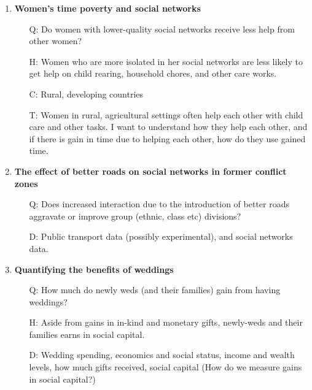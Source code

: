 \documentclass[12pt]{article}
\begin{document}
\begin{enumerate}
	\item \textbf{Women's time poverty and social networks}
		\begin{itemize}
			\item[Q:] Do women with lower-quality social networks receive less help from other women?
			\item[H:] Women who are more isolated in her social networks are less likely to get help on child rearing, household chores, and other care works.
			\item[C:] Rural, developing countries
			\item[T:] Women in rural, agricultural settings often help each other with child care and other tasks. I want to understand how they help each other, and if there is gain in time due to helping each other, how do they use gained time.
		\end{itemize}

	\item \textbf{The effect of better roads on social networks in former conflict zones}
		\begin{itemize}
			\item[Q:] Does increased interaction due to the introduction of better roads aggravate or improve group (ethnic, class etc) divisions?
			\item[D:] Public transport data (possibly experimental), and social networks data.
		\end{itemize}	

	\item \textbf{Quantifying the benefits of weddings}
		\begin{itemize}
			\item[Q:] How much do newly weds (and their families) gain from having weddings? 
			\item[H:] Aside from gains in in-kind and monetary gifts, newly-weds and their families earns in social capital. 
			\item[D:] Wedding spending, economics and social status, income and wealth levels, how much gifts received, social capital (How do we measure gains in social capital?) 
		\end{itemize}
	

\end{enumerate}
\end{document}
